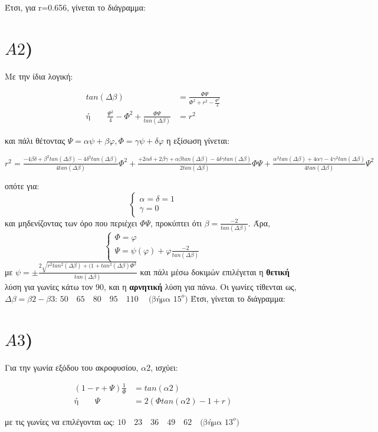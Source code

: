 \documentclass[12pt,a4paper,twoside]{extreport}
\begin{document}
Έτσι, για r=0.656, γίνεται το διάγραμμα:

\newpage
\section*{$A2$)}
Με την ίδια λογική:
\begin{center}
    \begin{align*}
    tan(Δβ) & = \frac{ΦΨ}{Φ^2 +r^2 - \frac{Ψ^2}{4} } \\
    \text{ή} \qquad    \frac{Ψ^2}{4}-Φ^2+\frac{ΦΨ}{tan(Δβ)} & = r^2 
    \end{align*}
\end{center}
και πάλι θέτοντας $Ψ = αψ + βφ, Φ=γψ + δφ$ η εξίσωση γίνεται:
\begin{center}
    $\displaystyle r^2 = \frac{-4βδ + β^2 tan(Δβ)-4δ^2tan(Δβ)}{4tan(Δβ)}Φ^2 + \frac{+2αδ+2βγ+αβtan(Δβ)-4δγtan(Δβ)}{2tan(Δβ)}ΦΨ+ \frac{α^2tan(Δβ)+4αγ-4γ^2tan(Δβ)}{4tan(Δβ)}Ψ^2$
\end{center}
οπότε για:
\begin{equation*}
\left\{ \begin{array}
  {lr} α=δ=1 \\  γ=0
\end{array} \right.
\end{equation*}
και μηδενίζοντας των όρο που περιέχει $ΦΨ$, προκύπτει ότι $β=\frac{-2}{tan(Δβ)}$. Άρα,
\begin{equation*}
\left \{ \begin{array}
  {lr} Φ=φ \\  Ψ=ψ(φ)+φ\frac{-2}{tan(Δβ)}  
\end{array}\right.
\end{equation*}
με $ψ=\pm \frac{2\sqrt{r^2tan^2(Δβ)+(1+tan^2(Δβ)Φ^2}}{tan(Δβ)}$
\newline και πάλι μέσω δοκιμών επιλέγεται η \textbf{θετική} λύση για γωνίες κάτω τον 90, και η \textbf{αρνητική} λύση για πάνω. Οι γωνίες τίθενται ως, $Δβ=β2-β3$:
\newline $50 \quad 65 \quad 80 \quad 95 \quad 110 \quad\ \text{(βήμα $15^o$)}$
\newline Έτσι, γίνεται το διάγραμμα:
\newpage
\section*{$A3$)}
Για την γωνία εξόδου του ακροφυσίου, $α2$, ισχύει:
\begin{center}
    \begin{align*}
        (1-r+Ψ)\frac{1}{Φ} & = tan(α2) \\
        \text{ή} \qquad Ψ & = 2(Φtan(α2)-1+r)
            \end{align*}
\end{center}
με τις γωνίες να επιλέγονται ως:
\newline $10 \quad 23\quad36\quad49\quad62\quad\text{(βήμα $13^o$)}$
\end{document}
